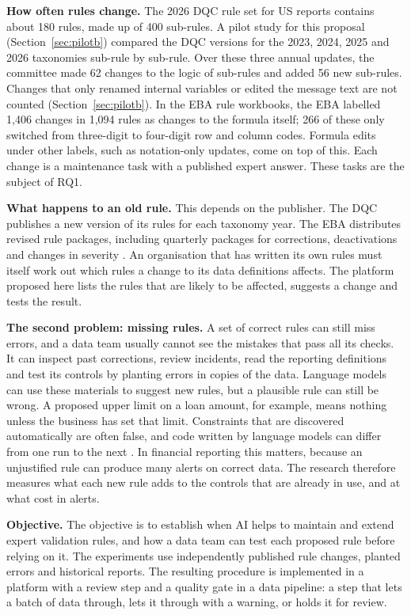 \documentclass[11pt,a4paper]{article}
\begin{document}
\textbf{How often rules change.} The 2026 DQC rule set for US reports contains about 180 rules, made up of 400 sub-rules. A pilot study for this proposal (Section~\ref{sec:pilotb}) compared the DQC versions for the 2023, 2024, 2025 and 2026 taxonomies sub-rule by sub-rule. Over these three annual updates, the committee made 62 changes to the logic of sub-rules and added 56 new sub-rules. Changes that only renamed internal variables or edited the message text are not counted (Section~\ref{sec:pilotb}). In the EBA rule workbooks, the EBA labelled 1,406 changes in 1,094 rules as changes to the formula itself; 266 of these only switched from three-digit to four-digit row and column codes. Formula edits under other labels, such as notation-only updates, come on top of this. Each change is a maintenance task with a published expert answer. These tasks are the subject of RQ1.

\textbf{What happens to an old rule.} This depends on the publisher. The DQC publishes a new version of its rules for each taxonomy year. The EBA distributes revised rule packages, including quarterly packages for corrections, deactivations and changes in severity \cite{dqc,eba}. An organisation that has written its own rules must itself work out which rules a change to its data definitions affects. The platform proposed here lists the rules that are likely to be affected, suggests a change and tests the result.

\textbf{The second problem: missing rules.} A set of correct rules can still miss errors, and a data team usually cannot see the mistakes that pass all its checks. It can inspect past corrections, review incidents, read the reporting definitions and test its controls by planting errors in copies of the data. Language models can use these materials to suggest new rules, but a plausible rule can still be wrong. A proposed upper limit on a loan amount, for example, means nothing unless the business has set that limit. Constraints that are discovered automatically are often false, and code written by language models can differ from one run to the next \cite{martin,ouyang}. In financial reporting this matters, because an unjustified rule can produce many alerts on correct data. The research therefore measures what each new rule adds to the controls that are already in use, and at what cost in alerts.

\textbf{Objective.} The objective is to establish when AI helps to maintain and extend expert validation rules, and how a data team can test each proposed rule before relying on it. The experiments use independently published rule changes, planted errors and historical reports. The resulting procedure is implemented in a platform with a review step and a quality gate in a data pipeline: a step that lets a batch of data through, lets it through with a warning, or holds it for review.
\end{document}
